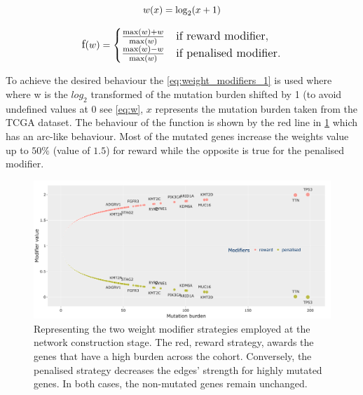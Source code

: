 \begin{equation} \label{eq:w}
    \large{
    w(x) = \log_2(x+1)
    }
\end{equation}

\begin{equation} \label{eq:weight_modifiers_1}
    \large{
    \text{f}(w) = 
    \begin{cases} 
    \frac{\max(w) + w}{\max(w)} & \text{if reward modifier}, \\
    \frac{\max(w) - w}{\max(w)} & \text{if penalised modifier}.
    \end{cases}
    }
\end{equation}

To achieve the desired behaviour the \cref{eq:weight_modifiers_1} is used where where w is the $log_2$ transformed of the mutation burden shifted by 1 (to avoid undefined values at 0 see \cref{eq:w}, $x$ represents the mutation burden taken from the TCGA dataset.  The behaviour of the function is shown by the red line in \cref{fig:N_I:modifiers} which has an arc-like behaviour. Most of the mutated genes increase the weights value up to $50\%$ (value of $1.5$) for reward while the opposite is true for the penalised modifier. 



\begin{figure}[!htb]    
    \centering
    \includegraphics[width=1.0\textwidth,keepaspectratio]{Sections/Network_I/Resources/Methods/modifiers.png}
    \caption[Reward v1 vs Penalised edge weight modifiers]{Representing the two weight modifier strategies employed at the network construction stage. The red, reward strategy, awards the genes that have a high burden across the cohort. Conversely, the  penalised strategy decreases the edges' strength for highly mutated genes. In both cases, the non-mutated genes remain unchanged.}
    \label{fig:N_I:modifiers}
\end{figure}

